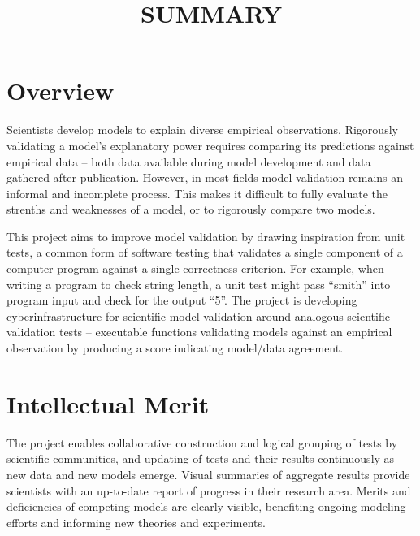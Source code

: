 \documentclass[11pt,letterpaper]{article}
\begin{document}
\title{SUMMARY}

\section{Overview}
Scientists develop models to explain diverse empirical observations. 
Rigorously validating a model’s explanatory power requires comparing its predictions against empirical data -- both data available during model development and data gathered after publication. 
However, in most fields model validation remains an informal and incomplete process. 
This makes it difficult to fully evaluate the strenths and weaknesses of a model, or to rigorously compare two models.

This project aims to improve model validation by drawing inspiration from unit tests, a common form of software testing that validates a single component of a computer program against a single correctness criterion. 
For example, when writing a program to check string length, a unit test might pass ``smith'' into program input and check for the output ``5''.   
The project is developing cyberinfrastructure for scientific model validation around analogous scientific validation tests -- 
executable functions validating models against an empirical observation by producing a score indicating model/data agreement. 



\section{Intellectual Merit}
The project enables collaborative construction and logical grouping of tests by scientific communities, and updating of tests and their results continuously as new data and new models emerge. 
Visual summaries of aggregate results provide scientists with an up-to-date report of progress in their research area. 
Merits and deficiencies of competing models are clearly visible, benefiting ongoing modeling efforts and informing new theories and experiments.
\end{document}
